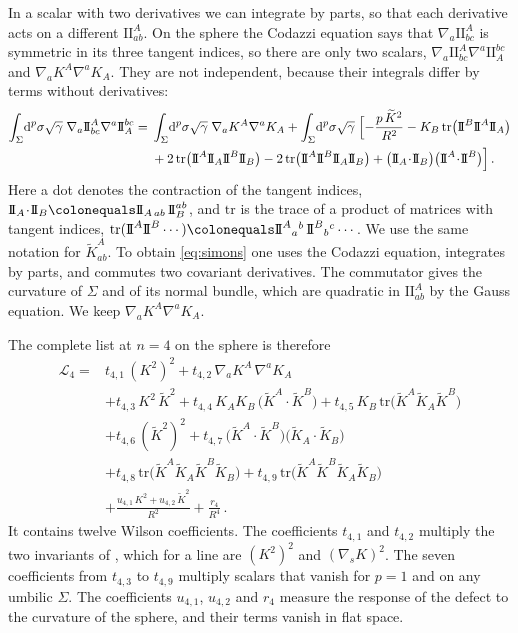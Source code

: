 \documentclass[a4paper,11pt]{article}
\newcommand{\II}{\mathrm{I\!I}}
\newcommand{\Kt}{\widetilde{K}}
\newcommand{\dd}{\mathrm{d}}
\begin{document}
In a scalar with two derivatives we can integrate by parts, so that each derivative acts on a different $\II^A_{ab}$. On the sphere the Codazzi equation says that $\nabla_a\II^A_{bc}$ is symmetric in its three tangent indices, so there are only two scalars, $\nabla_a\II^A_{bc}\nabla^a\II_A^{bc}$ and $\nabla_aK^A\nabla^aK_A$. They are not independent, because their integrals differ by terms without derivatives:
\begin{equation}\label{eq:simons}
	\begin{aligned}
		\int_\Sigma\!\dd^p\sigma\sqrt\gamma\;\nabla_a\II^A_{bc}\nabla^a\II_A^{bc}
		={}&\int_\Sigma\!\dd^p\sigma\sqrt\gamma\;\nabla_aK^A\nabla^aK_A
		+\int_\Sigma\!\dd^p\sigma\sqrt\gamma\;\Bigl[-\frac{p\,\Kt^2}{R^2}-K_B\,\mathrm{tr}\bigl(\II^B\II^A\II_A\bigr)\\
		&+2\,\mathrm{tr}\bigl(\II^A\II_A\II^B\II_B\bigr)-2\,\mathrm{tr}\bigl(\II^A\II^B\II_A\II_B\bigr)+\bigl(\II_A\!\cdot\!\II_B\bigr)\bigl(\II^A\!\cdot\!\II^B\bigr)\Bigr]\, .
	\end{aligned}
\end{equation}
Here a dot denotes the contraction of the tangent indices, $\II_A\!\cdot\!\II_B\colonequals\II_{A\,ab}\,\II_B^{ab}$, and $\mathrm{tr}$ is the trace of a product of matrices with tangent indices, $\mathrm{tr}(\II^A\II^B\cdots)\colonequals\II^{A}{}_{a}{}^{b}\,\II^{B}{}_{b}{}^{c}\cdots$. We use the same notation for $\Kt^A_{ab}$. To obtain \eqref{eq:simons} one uses the Codazzi equation, integrates by parts, and commutes two covariant derivatives. The commutator gives the curvature of $\Sigma$ and of its normal bundle, which are quadratic in $\II^A_{ab}$ by the Gauss equation. We keep $\nabla_aK^A\nabla^aK_A$.

The complete list at $n=4$ on the sphere is therefore
\begin{equation}\label{eq:L4}
	\begin{aligned}
		\mathcal{L}_4={}&t_{4,1}\,(K^2)^2+t_{4,2}\,\nabla_aK^A\,\nabla^aK_A\\
		&+t_{4,3}\,K^2\,\Kt^2+t_{4,4}\,K_AK_B\,\bigl(\Kt^A\!\cdot\!\Kt^B\bigr)+t_{4,5}\,K_B\,\mathrm{tr}\bigl(\Kt^A\Kt_A\Kt^B\bigr)\\
		&+t_{4,6}\,(\Kt^2)^2+t_{4,7}\,\bigl(\Kt^A\!\cdot\!\Kt^B\bigr)\bigl(\Kt_A\!\cdot\!\Kt_B\bigr)\\
		&+t_{4,8}\,\mathrm{tr}\bigl(\Kt^A\Kt_A\Kt^B\Kt_B\bigr)+t_{4,9}\,\mathrm{tr}\bigl(\Kt^A\Kt^B\Kt_A\Kt_B\bigr)\\
		&+\frac{u_{4,1}\,K^2+u_{4,2}\,\Kt^2}{R^2}+\frac{r_4}{R^4}\, .
	\end{aligned}
\end{equation}
It contains twelve Wilson coefficients. The coefficients $t_{4,1}$ and $t_{4,2}$ multiply the two invariants of \cite{BMP}, which for a line are $(K^2)^2$ and $(\nabla_sK)^2$. The seven coefficients from $t_{4,3}$ to $t_{4,9}$ multiply scalars that vanish for $p=1$ and on any umbilic $\Sigma$. The coefficients $u_{4,1}$, $u_{4,2}$ and $r_4$ measure the response of the defect to the curvature of the sphere, and their terms vanish in flat space.
\end{document}
